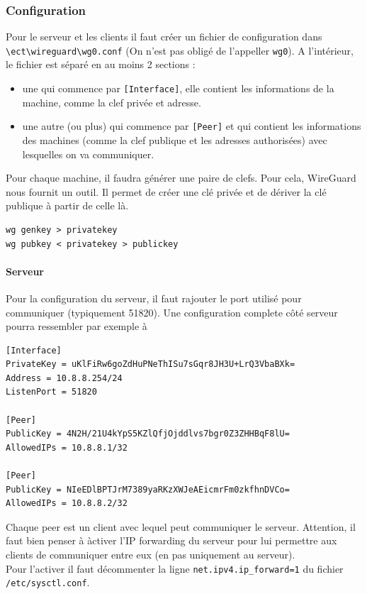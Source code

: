 \documentclass[a4paper, 12pt]{article}
\begin{document}
\subsubsection{Configuration}
Pour le serveur et les clients il faut créer un fichier de configuration dans \\\verb+\ect\wireguard\wg0.conf+ (On n'est pas obligé de l'appeller \verb+wg0+). A l'intérieur, le fichier est séparé en au moins 2 sections :
\begin{itemize}
\item une qui commence par \verb+[Interface]+, elle contient les informations de la machine, comme la clef privée et adresse.
\item une autre (ou plus) qui commence par \verb+[Peer]+ et qui contient les informations des machines (comme la clef publique et les adresses authorisées) avec lesquelles on va communiquer. \\
\end{itemize}

Pour chaque machine, il faudra générer une paire de clefs. Pour cela, WireGuard nous fournit un outil. Il permet de créer une clé privée et de dériver la clé publique à partir de celle là.

\begin{verbatim}
wg genkey > privatekey
wg pubkey < privatekey > publickey
\end{verbatim}


\paragraph{Serveur}
Pour la configuration du serveur, il faut rajouter le port utilisé pour communiquer (typiquement 51820). Une configuration complete côté serveur pourra ressembler par exemple à

\begin{verbatim}
[Interface]
PrivateKey = uKlFiRw6goZdHuPNeThISu7sGqr8JH3U+LrQ3VbaBXk= 
Address = 10.8.8.254/24
ListenPort = 51820

[Peer]
PublicKey = 4N2H/21U4kYpS5KZlQfjOjddlvs7bgr0Z3ZHHBqF8lU=
AllowedIPs = 10.8.8.1/32

[Peer] 
PublicKey = NIeEDlBPTJrM7389yaRKzXWJeAEicmrFm0zkfhnDVCo=  
AllowedIPs = 10.8.8.2/32
\end{verbatim}
Chaque peer est un client avec lequel peut communiquer le serveur. Attention, il faut bien penser à àctiver l'IP forwarding du serveur pour lui permettre aux clients de communiquer entre eux (en pas uniquement au serveur). \\
Pour l'activer il faut décommenter la ligne \verb+net.ipv4.ip_forward=1+ du fichier \\\verb+/etc/sysctl.conf+.
\end{document}
